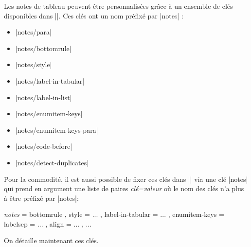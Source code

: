 \documentclass[dvipsnames]{article}%
\begin{document}
Les notes de tableau peuvent être personnalisées grâce à un ensemble de clés
disponibles dans |\NiceMatrixOptions|. Ces clés ont un nom préfixé par |notes| :
\begin{itemize}
\item |notes/para|
\item |notes/bottomrule|
\item |notes/style|
\item |notes/label-in-tabular|
\item |notes/label-in-list|
\item |notes/enumitem-keys|
\item |notes/enumitem-keys-para|
\item |notes/code-before|
\item |notes/detect-duplicates|
\end{itemize}
Pour la commodité, il est aussi possible de fixer ces clés dans
|\NiceMatrixOptions| via une clé |notes| qui prend en argument une liste de
paires \textsl{clé=valeur} où le nom des clés n'a plus à être préfixé par
|notes|:
\begin{center}
\small
\begin{Code}
\NiceMatrixOptions
  {
    \emph{notes} =
     {
       bottomrule ,
       style = ... ,
       label-in-tabular = ... ,
       enumitem-keys =
        {
          labelsep = ... ,
          align = ... ,
          ...
        }
     }
  }
\end{Code}
\end{center}


\medskip
On détaille maintenant ces clés.
\end{document}
